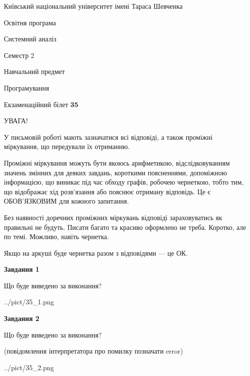 \documentclass[12pt, ukrainian]{article}
\begin{document}
{{\begin {small}\par
{ \center  Київський національний університет імені Тараса Шевченка \par}
{\parbox {5 cm}{Освітня програма \hfill}{\parbox {7 cm}{Системний аналіз \hfill}}\parbox {6 cm}{\hfill Семестр 2}}\par
{\parbox {5 cm} {Навчальний предмет \hfill}\parbox {7 cm}{Програмування \hfill}\parbox {6cm}{\hfill}\par}\vspace{-7pt} \end{small}}{\center Екзаменаційний білет \No \textbf
{ 35 }\par}}
{
\begin {large}
УВАГА!

У письмовій роботі мають зазначатися всі відповіді, а також проміжні міркування, що передували їх отриманню.

Проміжні міркування можуть бути якоюсь арифметикою, відслідковуванням зна\-чень змінних для деяких завдань,
короткими поясненнями, допоміжною інформацією, що виникає під час обходу графів, робочею чернеткою,
тобто тим, що відображає хід розв’язання або пояснює отриману відповідь.
Це є ОБОВ’ЯЗКОВИМ для кожного запитання.

Без наявності доречних проміжних міркувань відповіді зараховуватись як правиль\-ні не будуть.
Писати багато та красиво оформлено не треба. Коротко, але по темі. Можли\-во, навіть чернетка.

Якщо на аркуші буде чернетка разом з відповідями --- це ОК.

\newpage

{\begin {center}\textbf{Завдання 1}\end {center}}\par
Що буде виведено за виконання?\par
\begin{center}
	{../pict/35_1.png}
\end{center}
\newpage

{\begin {center}\textbf{Завдання 2}\end {center}}\par
Що буде виведено за виконання?\par
 (повідомлення інтерпретатора про помилку позначати error)\par
\begin{center}
	{../pict/35_2.png}
\end{center}
\newpage


\end{large}}
\end{document}
